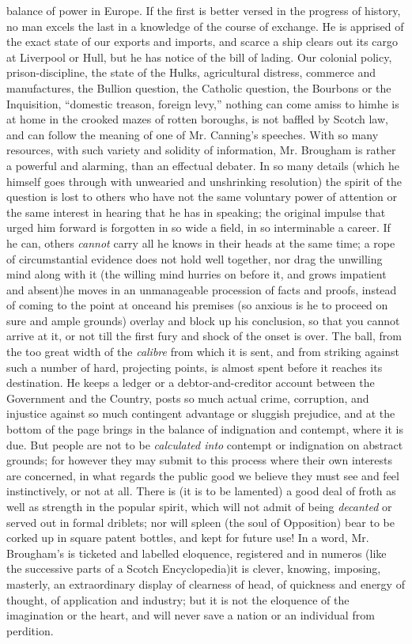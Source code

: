 balance of power in Europe. If the first is better versed in the
progress of history, no man excels the last in a knowledge of the
course of exchange. He is apprised of the exact state of our
exports and imports, and scarce a ship clears out its cargo at
Liverpool or Hull, but he has notice of the bill of lading. Our
colonial policy, prison-discipline, the state of the Hulks,
agricultural distress, commerce and manufactures, the Bullion
question, the Catholic question, the Bourbons or the Inquisition,
``domestic treason, foreign levy,'' nothing can come amiss to
him\textemdash he is at home in the crooked mazes of rotten
boroughs, is not baffled by Scotch law, and can follow the meaning
of one of Mr. Canning's speeches. With so many resources, with
such variety and solidity of information, Mr. Brougham is rather a
powerful and alarming, than an effectual debater. In so many
details (which he himself goes through with unwearied and
unshrinking resolution) the spirit of the question is lost to
others who have not the same voluntary power of attention or the
same interest in hearing that he has in speaking; the original
impulse that urged him forward is forgotten in so wide a field, in
so interminable a career. If he can, others \emph{cannot} carry
all he knows in their heads at the same time; a rope of
circumstantial evidence does not hold well together, nor drag the
unwilling mind along with it (the willing mind hurries on before
it, and grows impatient and absent)\textemdash he moves in an
unmanageable procession of facts and proofs, instead of coming to
the point at once\textemdash and his premises (so anxious is he to
proceed on sure and ample grounds) overlay and block up his
conclusion, so that you cannot arrive at it, or not till the first
fury and shock of the onset is over. The ball, from the too great
width of the \emph{calibre} from which it is sent, and from
striking against such a number of hard, projecting points, is
almost spent before it reaches its destination. He keeps a ledger
or a debtor-and-creditor account between the Government and the
Country, posts so much actual crime, corruption, and injustice
against so much contingent advantage or sluggish prejudice, and at
the bottom of the page brings in the balance of indignation and
contempt, where it is due.  But people are not to be
\emph{calculated into} contempt or indignation on abstract
grounds; for however they may submit to this process where their
own interests are concerned, in what regards the public good we
believe they must see and feel instinctively, or not at all. There
is (it is to be lamented) a good deal of froth as well as strength
in the popular spirit, which will not admit of being
\emph{decanted} or served out in formal driblets; nor will spleen
(the soul of Opposition) bear to be corked up in square patent
bottles, and kept for future use! In a word, Mr. Brougham's is
ticketed and labelled eloquence, registered and in numeros (like
the successive parts of a Scotch Encyclopedia)\textemdash it is
clever, knowing, imposing, masterly, an extraordinary display of
clearness of head, of quickness and energy of thought, of
application and industry; but it is not the eloquence of the
imagination or the heart, and will never save a nation or an
individual from perdition.

